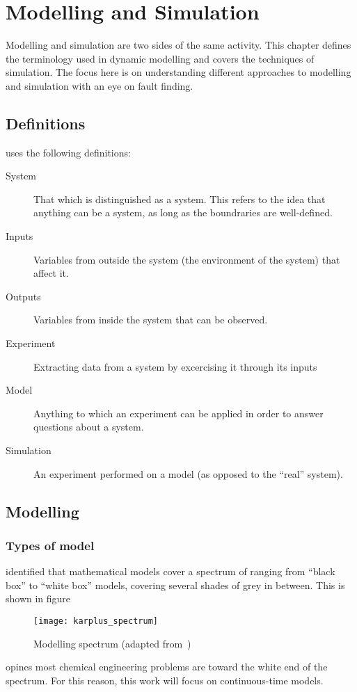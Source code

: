 \chapter{Modelling and Simulation}

\begin{overview}
Modelling and simulation are two sides of the same activity.
This chapter defines the terminology used in dynamic modelling and covers the techniques of simulation.
The focus here is on understanding different approaches to modelling and simulation with an eye on fault finding.
\end{overview}

\section{Definitions}
\citet[4--10]{cellier1991continuous} uses the following definitions:  
\begin{description}
\item[System] That which is distinguished as a system.  
This refers to the idea that anything can be a system, as long as the boundraries are well-defined.
\item[Inputs] Variables from outside the system (the environment of the system) that affect it.
\item[Outputs] Variables from inside the system that can be observed.
\item[Experiment] Extracting data from a system by excercising it through its inputs
\item[Model] Anything to which an experiment can be applied in order to answer questions about a system.
\item[Simulation] An experiment performed on a model (as opposed to the ``real'' system).
\end{description}

\section{Modelling}
\subsection{Types of model}
\citet{karplus1977spectrum} identified that mathematical models cover a spectrum of ranging from ``black box'' to ``white box'' models, covering several shades of grey in between.
This is shown in figure
\begin{figure}[htbp]
  \centering
  \texttt{[image: karplus\_spectrum]}
%  
  \caption[Modelling spectrum]{Modelling spectrum (adapted from~\citet{karplus1977spectrum})}
  \label{fig:karplusspectrum}
\end{figure}
\citet[15]{cellier1991continuous} opines most chemical engineering problems are toward the white end of the spectrum.
For this reason, this work will focus on continuous-time models.

